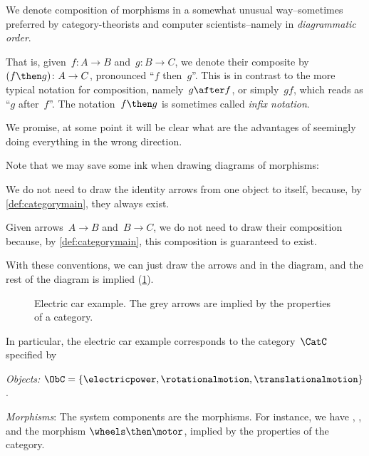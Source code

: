 \begin{remark}
We denote composition of morphisms in a somewhat unusual way--sometimes preferred by category-theorists and computer scientists--namely in \emph{diagrammatic order}.

That is, given~$f\colon A\to B$ and~$g\colon B\to C$, we denote their composite by~$(f\then g)\colon A\to C$, pronounced ``$f$ then~$g$''. This is in contrast to the more typical notation for composition, namely~$g\after f$, or simply~$gf$, which reads as ``$g$ after~$f$''. The notation~$f\then g$ is sometimes called \emph{infix notation}.

We promise, at some point it will be clear what are the advantages of seemingly doing everything 
in the wrong direction.
\end{remark}

Note that we may save some ink when drawing diagrams of morphisms:
\begin{compactitem}
\item We do not need to draw the identity arrows from one object to itself, because, by \cref{def:categorymain}, they always exist.
\item  Given arrows~$A\to B$ and~$B \to C$, we do not need to draw their composition because, by \cref{def:categorymain}, this composition is guaranteed to exist.
\end{compactitem}

With these conventions, we can just draw the arrows \motor and \wheels in the diagram, and the rest of the diagram is implied (\cref{fig:e5}).

\begin{figure}[h!]
    \centering
    \caption{Electric car example. The grey arrows are implied by the properties
    of a category.\label{fig:e5}}
\end{figure}

In particular, the electric car example corresponds to the category~$\CatC$ specified by
\begin{compactitem}
    \item \emph{Objects:} $\ObC=\{\electricpower,\rotationalmotion,\translationalmotion\}$.
    \item \emph{Morphisms}: The system components are the morphisms. For instance, we have \motor, \wheels, and the morphism $\wheels \then \motor$, implied by the properties of the category.
\end{compactitem}

